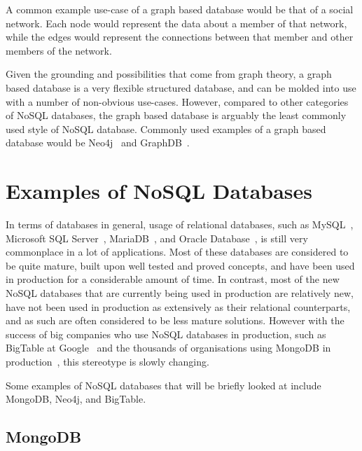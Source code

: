 \documentclass{article}
\begin{document}
A common example use-case of a graph based database would be that of a social network. Each node
would represent the data about a member of that network, while the edges would represent the
connections between that member and other members of the network.

Given the grounding and possibilities that come from graph theory, a graph based database is
a very flexible structured database, and can be molded into use with a number of non-obvious
use-cases. However, compared to other categories of NoSQL databases, the graph based database
is arguably the least commonly used style of NoSQL database. Commonly used examples of
a graph based database would be Neo4j~\cite{2_neo4j} and GraphDB~\cite{1_ontotext_2015}.






\section{Examples of NoSQL Databases} %
\label{sec:examples_of_nosql_databases}

In terms of databases in general, usage of relational databases, such as MySQL~\cite{1_mysqlcom_2015},
Microsoft SQL Server~\cite{4_microsoftcom_2015}, MariaDB~\cite{2_mariadborg_2015}, and Oracle Database~\cite{3_oraclecom_2015}, is still
very commonplace in a lot of applications. Most of these databases are considered to be quite mature, built upon well
tested and proved concepts, and have been used in production for a considerable amount of time. In contrast, most of
the new NoSQL databases that are currently being used in production are relatively new, have not been used in production
as extensively as their relational counterparts, and as such are often considered to be less mature solutions. However
with the success of big companies who use NoSQL databases in production, such as BigTable at Google~\cite{chang2008bigtable}
and the thousands of organisations using MongoDB in production~\cite{mongo_customers}, this stereotype is slowly changing.

Some examples of NoSQL databases that will be briefly looked at include MongoDB, Neo4j, and BigTable.

\subsection{MongoDB} %
\label{ssub:mongodb}
\end{document}

